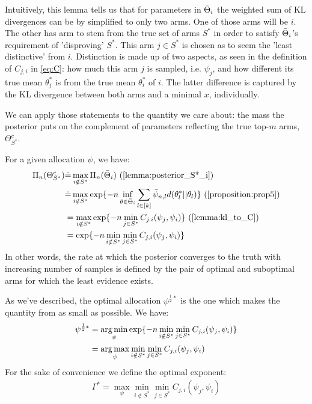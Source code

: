 Intuitively, this lemma tells us that for parameters in $\Bar{\Theta}_i$ the weighted sum of KL divergences can be by simplified to only two arms. One of those arms will be $i$. The other has arm to stem from the true set of arms $S^*$ in order to satisfy $\Bar{\Theta}_i$'s requirement of 'disproving' $S^*$. This arm $j \in S^*$ is chosen as to seem the 'least distinctive' from $i$. Distinction is made up of two aspects, as seen in the definition of $C_{j, i}$ in \eqref{eq:C}: how much this arm $j$ is sampled, i.e. $\psi_j$, and how different its true mean $\theta^*_j$ is from the true mean $\theta^*_i$ of $i$. The latter difference is captured by the KL divergence between both arms and a minimal $x$, individually.

We can apply those statements to the quantity we care about: the mass the posterior puts on the complement of parameters reflecting the true top-$m$ arms, $\Theta_{S^*}^c$.

For a given allocation $\psi$, we have:
\begin{align}
  \Pi_n(\Theta_{S^*}^c) &\deq \max_{i \notin S^*}\Pi_n(\bar{\Theta}_i) \text{ (\Cref{lemma:posterior_S*_i})}\\
    &\deq \max_{i \notin S^*} \exp\{-n\inf_{\theta \in \bar{\Theta}_i} \sum_{l \in [k]} \bar{\psi}_{n, l} d(\theta^*_l || \theta_l)\} \text{ (\Cref{proposition:prop5})} \\
    &= \max_{i \notin S^*} \exp\{-n \min_{j \in S^*} C_{j, i}(\psi_j, \psi_i)\} \text{ (\Cref{lemma:kl_to_C})} \\
    &= \exp\{-n \min_{i \notin S^*}\min_{j \in S^*} C_{j, i}(\psi_j, \psi_i)\} \label{eq:posterior}
\end{align}
In other words, the rate at which the posterior converges to the truth with increasing number of samples is defined by the pair of optimal and suboptimal arms for which the least evidence exists.

As we've described, the optimal allocation $\psi^{\frac{1}{2}*}$ is the one which makes the quantity from  as small as possible. We have:
\begin{align}
  \psi^{\frac{1}{2}*} &= \operatorname*{arg\,min}_{\psi} \exp\{-n \min_{i \notin S^*}\min_{j \in S^*} C_{j, i}(\psi_j, \psi_i)\} \\
    &= \operatorname*{arg\,max}_{\psi} \min_{i \notin S^*}\min_{j \in S^*} C_{j, i}(\psi_j, \psi_i) \label{eq:psi^*}
\end{align}
For the sake of convenience we define the optimal exponent:
\begin{align}
  \Gamma^* = \max_{\psi} \min_{i \notin S^*}\min_{j \in S^*} C_{j, i}(\psi_j, \psi_i) \label{eq:gamma^*}
\end{align}

